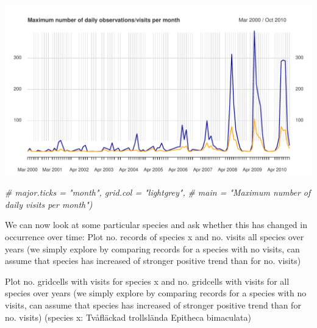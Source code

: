 \documentclass[
  10pt,
]{article}
\newenvironment{Shaded}{\begin{snugshade}}{\end{snugshade}}
\newcommand{\CommentTok}[1]{\textcolor[rgb]{0.56,0.35,0.01}{\textit{#1}}}
\begin{document}
\includegraphics{r-tools-tutorial_files/figure-latex/monthly and plot-2.pdf}

\begin{Shaded}
\begin{Highlighting}[]
     \CommentTok{\# major.ticks = "month", grid.col = "lightgrey", }
     \CommentTok{\# main = "Maximum number of daily visits per month")}
\end{Highlighting}
\end{Shaded}

We can now look at some particular species and ask whether this has changed in occurrence over time:
Plot no. records of species x and no. visits all species over years (we simply explore by comparing records for a species with no visits, can assume that species has increased of stronger positive trend than for no. visits)

Plot no. gridcells with visits for species x and no. gridcells with visits for all species over years (we simply explore by comparing records for a species with no visits, can assume that species has increased of stronger positive trend than for no. visits)
(species x: Tvåfläckad trollslända Epitheca bimaculata)

  
\end{document}
